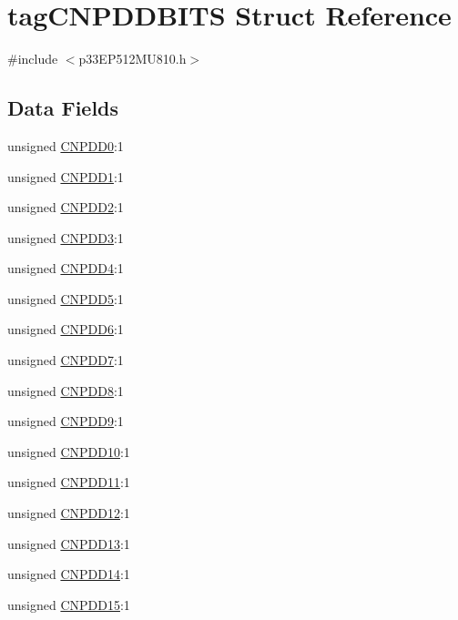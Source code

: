 \hypertarget{structtag_c_n_p_d_d_b_i_t_s}{}\section{tag\+C\+N\+P\+D\+D\+B\+I\+TS Struct Reference}
\label{structtag_c_n_p_d_d_b_i_t_s}


{\ttfamily \#include $<$p33\+E\+P512\+M\+U810.\+h$>$}

\subsection*{Data Fields}
\begin{DoxyCompactItemize}
\item 
unsigned \hyperlink{structtag_c_n_p_d_d_b_i_t_s_a3bae1bd112471d8686450fba5e2f05d1}{C\+N\+P\+D\+D0}\+:1
\item 
unsigned \hyperlink{structtag_c_n_p_d_d_b_i_t_s_a02b5183fd2247a12f8b0270400705c7c}{C\+N\+P\+D\+D1}\+:1
\item 
unsigned \hyperlink{structtag_c_n_p_d_d_b_i_t_s_a182570e48221d45517d56fcd459f01bc}{C\+N\+P\+D\+D2}\+:1
\item 
unsigned \hyperlink{structtag_c_n_p_d_d_b_i_t_s_a14c5dd213249928a6d4d5abbddf4784c}{C\+N\+P\+D\+D3}\+:1
\item 
unsigned \hyperlink{structtag_c_n_p_d_d_b_i_t_s_a4ea827b4dd39f4e0fb9c9feefef8f5d7}{C\+N\+P\+D\+D4}\+:1
\item 
unsigned \hyperlink{structtag_c_n_p_d_d_b_i_t_s_aad28f2b9fcb6667168c7c5d162b40cf8}{C\+N\+P\+D\+D5}\+:1
\item 
unsigned \hyperlink{structtag_c_n_p_d_d_b_i_t_s_af35a51d5640bcd71d1e6b7b2750de7d0}{C\+N\+P\+D\+D6}\+:1
\item 
unsigned \hyperlink{structtag_c_n_p_d_d_b_i_t_s_a46e6511f70f4acd00abf1cec327e6871}{C\+N\+P\+D\+D7}\+:1
\item 
unsigned \hyperlink{structtag_c_n_p_d_d_b_i_t_s_a06d43dd6808104ee0cc264e4dda938d2}{C\+N\+P\+D\+D8}\+:1
\item 
unsigned \hyperlink{structtag_c_n_p_d_d_b_i_t_s_a6e596db7dc397068c09fd1eb083ed114}{C\+N\+P\+D\+D9}\+:1
\item 
unsigned \hyperlink{structtag_c_n_p_d_d_b_i_t_s_adba951bf2f069095ca0451c64fdfa56b}{C\+N\+P\+D\+D10}\+:1
\item 
unsigned \hyperlink{structtag_c_n_p_d_d_b_i_t_s_a79d525b5246af2011a8841dd146dddc9}{C\+N\+P\+D\+D11}\+:1
\item 
unsigned \hyperlink{structtag_c_n_p_d_d_b_i_t_s_a6d5df4a44b29a493526a67c2e0c81f35}{C\+N\+P\+D\+D12}\+:1
\item 
unsigned \hyperlink{structtag_c_n_p_d_d_b_i_t_s_abdf06d53cf99ee478cff645cfb9409ea}{C\+N\+P\+D\+D13}\+:1
\item 
unsigned \hyperlink{structtag_c_n_p_d_d_b_i_t_s_a4336fa2b2837d21b8c4cc914e3a8f2ad}{C\+N\+P\+D\+D14}\+:1
\item 
unsigned \hyperlink{structtag_c_n_p_d_d_b_i_t_s_ad9a86c2794420a6b235841a5df5e7083}{C\+N\+P\+D\+D15}\+:1
\end{DoxyCompactItemize}


